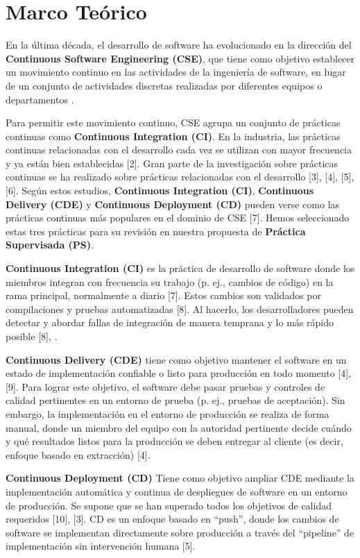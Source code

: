 \chapter{Marco Teórico}\label{cap:marco_teorico}
En la última década, el desarrollo de software ha evolucionado en la dirección del \textbf{Continuous Software Engineering (CSE)}, que tiene como objetivo establecer un movimiento continuo en las actividades de la ingeniería de software, en lugar de un conjunto de actividades discretas realizadas por diferentes equipos o departamentos \cite{FITZGERALD2017176}.

Para permitir este movimiento continuo, CSE agrupa un conjunto de prácticas continuas como \textbf{Continuous Integration (CI)}. En la industria, las prácticas continuas relacionadas con el desarrollo cada vez se utilizan con mayor frecuencia y ya están bien establecidas [2]. Gran parte de la investigación sobre prácticas continuas se ha realizado sobre prácticas relacionadas con el desarrollo  [3], [4], [5], [6]. Según estos estudios, \textbf{Continuous Integration (CI)}, \textbf{Continuous Delivery (CDE)} y \textbf{Continuous Deployment (CD)} pueden verse como las prácticas continuas más populares en el dominio de CSE [7]. Hemos seleccionado estas tres prácticas para su revisión en nuestra propuesta de \textbf{Práctica Supervisada (PS)}.

\textbf{Continuous Integration (CI)} es la práctica de desarrollo de software donde los miembros integran con frecuencia su trabajo (p. ej., cambios de código) en la rama principal, normalmente a diario [7].  Estos cambios son validados por compilaciones y pruebas automatizadas [8]. Al hacerlo, los desarrolladores pueden detectar y abordar fallas de integración de manera temprana y lo más rápido posible [8], \cite{FITZGERALD2017176}.

\textbf{Continuous Delivery (CDE)} tiene como objetivo mantener el software en un estado de implementación confiable o listo para producción en todo momento [4], [9]. Para lograr este objetivo, el software debe pasar pruebas y controles de calidad pertinentes en un entorno de prueba (p. ej., pruebas de aceptación). Sin embargo, la implementación en el entorno de producción se realiza de forma manual, donde un miembro del equipo con la autoridad pertinente decide cuándo y qué resultados listos para la producción se deben entregar al cliente (es decir, enfoque basado en extracción) [4].

\textbf{Continuous Deployment (CD)} Tiene como objetivo ampliar CDE mediante la implementación automática y continua de despliegues de software en un entorno de producción. Se supone que se han superado todos los objetivos de calidad requeridos [10], [3]. CD es un enfoque basado en “push”, donde los cambios de software se implementan directamente sobre producción a través del “pipeline” de implementación sin intervención humana [5]. 

